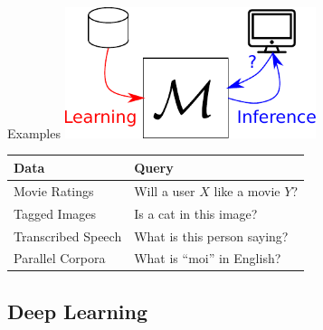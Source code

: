 \documentclass{beamer}
\begin{document}
\begin{frame}{Examples}
    \centering
    \includegraphics[width=0.55\textwidth]{machinelearning.pdf}

    \vspace{3mm}
    \begin{center}
    { \small
    \begin{tabular}{l | l}
        Data & Query \\
        \hline
        \hline
        Movie Ratings & 
        Will a user $X$ like a movie $Y$? \\
        Tagged Images &
        Is a cat in this image?  \\
        Transcribed Speech &
        What is this person saying?  \\
        Parallel Corpora &
        What is ``moi'' in English?  
    \end{tabular}
    }
\end{center}
\end{frame}

\subsection{Deep Learning}
\end{document}
